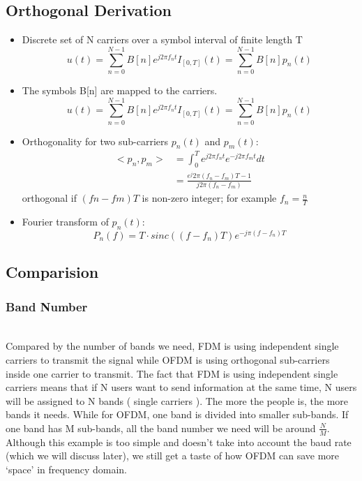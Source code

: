 \documentclass[twocolumn,conference]{IEEEtran}
\begin{document}
\subsection{Orthogonal Derivation}
    \begin{itemize}
        \item Discrete set of N carriers over a symbol interval of finite length T
        \[
        u(t)=\sum_{n=0}^{N-1}B[n]e^{j2\pi f_nt}I_{[0,T]}(t)=\sum_{n=0}^{N-1}B[n]p_n(t)
        \]

        \item The symbols B[n] are mapped to the carriers.
        \[
        u(t)=\sum_{n=0}^{N-1}B[n]e^{j2\pi f_nt}I_{[0,T]}(t)=\sum_{n=0}^{N-1}B[n]p_n(t)
        \]

        \item Orthogonality for two sub-carriers $p_n(t)$ and $p_m(t)$:
        \[\begin{aligned}
            <p_n,p_m>&=\int_{0}^{T}e^{j2\pi f_nt}e^{-j2\pi f_mt}dt\\
        &=\frac{e^j2\pi(f_n-f_m)T-1}{j2\pi(f_n-f_m)}
           \end{aligned}\]
        orthogonal if $(fn-fm)T$ is non-zero integer; for example $f_n = \frac{n}{T}$

        \item Fourier transform of $p_n(t)$:
        \[
        P_n(f)=T\cdot sinc((f-f_n)T)e^{-j\pi(f-f_n)T}
        \]

        

    \end{itemize}

\subsection{Comparision}
    \subsubsection{Band Number}\hfill\\
    \indent Compared by the number of bands we need, FDM is using independent single carriers to transmit the signal while OFDM is using orthogonal sub-carriers inside one carrier to transmit. The fact that FDM is using independent single carriers means that if N users want to send information at the same time, N users will be assigned to N bands ( single carriers ). The more the people is, the more bands it needs. While for OFDM, one band is divided into smaller sub-bands. If one band has M sub-bands, all the band number we need will be around $\frac{N}{M}$. Although this example is too simple and doesn’t take into account the baud rate (which we will discuss later), we still get a taste of how OFDM can save more ‘space’ in frequency domain.
    
\end{document}
